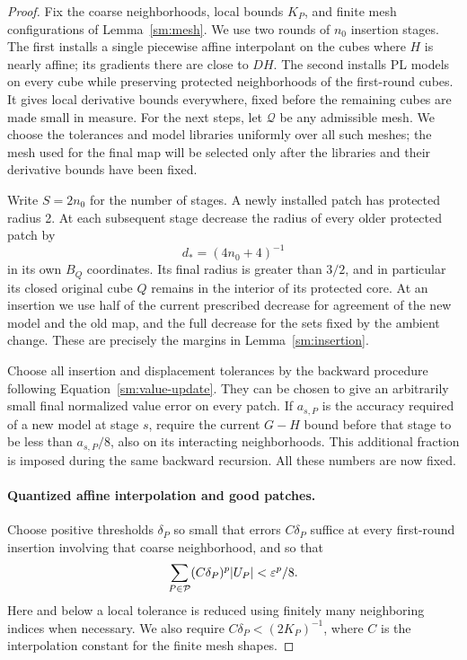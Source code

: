 \begin{proof}
Fix the coarse neighborhoods, local bounds $K_P$, and finite
mesh configurations of Lemma~\ref{sm:mesh}.  We use two rounds of
$n_0$ insertion stages.  The first installs a single piecewise
affine interpolant on the cubes where $H$ is nearly affine; its
gradients there are close to $DH$.  The second installs PL models
on every cube while preserving protected neighborhoods of the
first-round cubes.  It gives
local derivative bounds everywhere, fixed before the remaining
cubes are made small in measure.  For the next steps, let
$\mathcal Q$ be any admissible mesh.  We choose the tolerances
and model libraries uniformly over all such meshes; the mesh
used for the final map will be selected only after the libraries
and their derivative bounds have been fixed.

Write $S=2n_0$ for the number of stages.  A newly installed patch
has protected radius 2.  At each subsequent stage decrease
the radius of every older protected patch by
\begin{equation}
 \label{sm:shrink-size}
 d_*=(4n_0+4)^{-1}
\end{equation}
in its own $B_Q$ coordinates.  Its final radius is greater
than $3/2$, and in particular its closed original cube $Q$
remains in the interior of its protected core.  At an
insertion we use half of the current prescribed decrease
for agreement of the new model and the old map, and the
full decrease for the sets fixed by the ambient change.
These are precisely the margins in
Lemma~\ref{sm:insertion}.

Choose all insertion and displacement tolerances by the
backward procedure following Equation~\eqref{sm:value-update}.
They can be chosen to give an arbitrarily small final
normalized value error on every patch.  If $a_{s,P}$ is
the accuracy required of a new model at stage $s$, require
the current $G-H$ bound before that stage to be less than
$a_{s,P}/8$, also on its interacting neighborhoods.  This
additional fraction is imposed during the same backward
recursion.  All these numbers are now fixed.

\paragraph{Quantized affine interpolation and good patches.}
Choose positive thresholds $\delta_P$ so small that errors
$C\delta_P$ suffice at every first-round insertion involving
that coarse neighborhood, and so that
\begin{equation}
 \label{sm:good-error-budget}
 \sum_{P\in\mathcal P}(C\delta_P)^p |U_P|<\varepsilon^p/8.
\end{equation}
Here and below a local tolerance is reduced using finitely many
neighboring indices when necessary.  We also require
$C\delta_P<(2K_P)^{-1}$, where $C$ is the interpolation
constant for the finite mesh shapes.


\end{proof}
